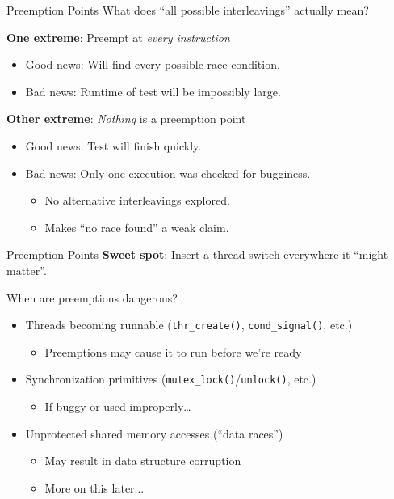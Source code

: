 \documentclass[xcolor=dvipsnames]{beamer}
\begin{document}
\begin{frame}{Preemption Points}
	What does ``all possible interleavings'' actually mean?

	\linegap
	{\bf One extreme}: Preempt at {\em every instruction}
	\begin{itemize}
		\item Good news: Will find every possible race condition.
		\item Bad news: Runtime of test will be impossibly large.
	\end{itemize}
	\linegap

	{\bf Other extreme}: {\em Nothing} is a preemption point
	\begin{itemize}
		\item Good news: Test will finish quickly.
		\item Bad news: Only one execution was checked for bugginess.
		\begin{itemize}
			\item No alternative interleavings explored.
			\item Makes ``no race found'' a weak claim.
		\end{itemize}
	\end{itemize}
\end{frame}


\begin{frame}{Preemption Points}
	\textbf{Sweet spot}: Insert a thread switch everywhere it ``might matter''.

	\linegap
	When are preemptions dangerous?
	\begin{itemize}
		\item Threads becoming runnable (\texttt{thr\_create()}, \texttt{cond\_signal()}, etc.)
			\begin{itemize}
				\item Preemptions may cause it to run before we're ready
			\end{itemize}
		\item Synchronization primitives (\texttt{mutex\_lock()}/\texttt{unlock()}, etc.)
			\begin{itemize}
				\item If buggy or used improperly\ldots
			\end{itemize}
		\item Unprotected shared memory accesses (``data races'')%
			\begin{itemize}
				\item May result in data structure corruption
				\item More on this later...
			\end{itemize}
	\end{itemize}

\end{frame}
\end{document}
